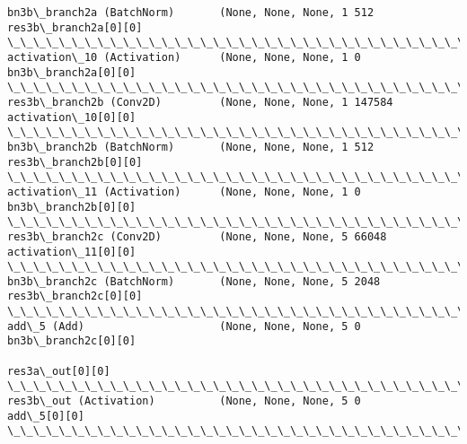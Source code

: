 \documentclass[11pt]{article}
\begin{document}
\begin{Verbatim}[commandchars=\\\{\}]
bn3b\_branch2a (BatchNorm)       (None, None, None, 1 512         res3b\_branch2a[0][0]             
\_\_\_\_\_\_\_\_\_\_\_\_\_\_\_\_\_\_\_\_\_\_\_\_\_\_\_\_\_\_\_\_\_\_\_\_\_\_\_\_\_\_\_\_\_\_\_\_\_\_\_\_\_\_\_\_\_\_\_\_\_\_\_\_\_\_\_\_\_\_\_\_\_\_\_\_\_\_\_\_\_\_\_\_\_\_\_\_\_\_\_\_\_\_\_\_\_\_
activation\_10 (Activation)      (None, None, None, 1 0           bn3b\_branch2a[0][0]              
\_\_\_\_\_\_\_\_\_\_\_\_\_\_\_\_\_\_\_\_\_\_\_\_\_\_\_\_\_\_\_\_\_\_\_\_\_\_\_\_\_\_\_\_\_\_\_\_\_\_\_\_\_\_\_\_\_\_\_\_\_\_\_\_\_\_\_\_\_\_\_\_\_\_\_\_\_\_\_\_\_\_\_\_\_\_\_\_\_\_\_\_\_\_\_\_\_\_
res3b\_branch2b (Conv2D)         (None, None, None, 1 147584      activation\_10[0][0]              
\_\_\_\_\_\_\_\_\_\_\_\_\_\_\_\_\_\_\_\_\_\_\_\_\_\_\_\_\_\_\_\_\_\_\_\_\_\_\_\_\_\_\_\_\_\_\_\_\_\_\_\_\_\_\_\_\_\_\_\_\_\_\_\_\_\_\_\_\_\_\_\_\_\_\_\_\_\_\_\_\_\_\_\_\_\_\_\_\_\_\_\_\_\_\_\_\_\_
bn3b\_branch2b (BatchNorm)       (None, None, None, 1 512         res3b\_branch2b[0][0]             
\_\_\_\_\_\_\_\_\_\_\_\_\_\_\_\_\_\_\_\_\_\_\_\_\_\_\_\_\_\_\_\_\_\_\_\_\_\_\_\_\_\_\_\_\_\_\_\_\_\_\_\_\_\_\_\_\_\_\_\_\_\_\_\_\_\_\_\_\_\_\_\_\_\_\_\_\_\_\_\_\_\_\_\_\_\_\_\_\_\_\_\_\_\_\_\_\_\_
activation\_11 (Activation)      (None, None, None, 1 0           bn3b\_branch2b[0][0]              
\_\_\_\_\_\_\_\_\_\_\_\_\_\_\_\_\_\_\_\_\_\_\_\_\_\_\_\_\_\_\_\_\_\_\_\_\_\_\_\_\_\_\_\_\_\_\_\_\_\_\_\_\_\_\_\_\_\_\_\_\_\_\_\_\_\_\_\_\_\_\_\_\_\_\_\_\_\_\_\_\_\_\_\_\_\_\_\_\_\_\_\_\_\_\_\_\_\_
res3b\_branch2c (Conv2D)         (None, None, None, 5 66048       activation\_11[0][0]              
\_\_\_\_\_\_\_\_\_\_\_\_\_\_\_\_\_\_\_\_\_\_\_\_\_\_\_\_\_\_\_\_\_\_\_\_\_\_\_\_\_\_\_\_\_\_\_\_\_\_\_\_\_\_\_\_\_\_\_\_\_\_\_\_\_\_\_\_\_\_\_\_\_\_\_\_\_\_\_\_\_\_\_\_\_\_\_\_\_\_\_\_\_\_\_\_\_\_
bn3b\_branch2c (BatchNorm)       (None, None, None, 5 2048        res3b\_branch2c[0][0]             
\_\_\_\_\_\_\_\_\_\_\_\_\_\_\_\_\_\_\_\_\_\_\_\_\_\_\_\_\_\_\_\_\_\_\_\_\_\_\_\_\_\_\_\_\_\_\_\_\_\_\_\_\_\_\_\_\_\_\_\_\_\_\_\_\_\_\_\_\_\_\_\_\_\_\_\_\_\_\_\_\_\_\_\_\_\_\_\_\_\_\_\_\_\_\_\_\_\_
add\_5 (Add)                     (None, None, None, 5 0           bn3b\_branch2c[0][0]              
                                                                 res3a\_out[0][0]                  
\_\_\_\_\_\_\_\_\_\_\_\_\_\_\_\_\_\_\_\_\_\_\_\_\_\_\_\_\_\_\_\_\_\_\_\_\_\_\_\_\_\_\_\_\_\_\_\_\_\_\_\_\_\_\_\_\_\_\_\_\_\_\_\_\_\_\_\_\_\_\_\_\_\_\_\_\_\_\_\_\_\_\_\_\_\_\_\_\_\_\_\_\_\_\_\_\_\_
res3b\_out (Activation)          (None, None, None, 5 0           add\_5[0][0]                      
\_\_\_\_\_\_\_\_\_\_\_\_\_\_\_\_\_\_\_\_\_\_\_\_\_\_\_\_\_\_\_\_\_\_\_\_\_\_\_\_\_\_\_\_\_\_\_\_\_\_\_\_\_\_\_\_\_\_\_\_\_\_\_\_\_\_\_\_\_\_\_\_\_\_\_\_\_\_\_\_\_\_\_\_\_\_\_\_\_\_\_\_\_\_\_\_\_\_

\end{Verbatim}
\end{document}
